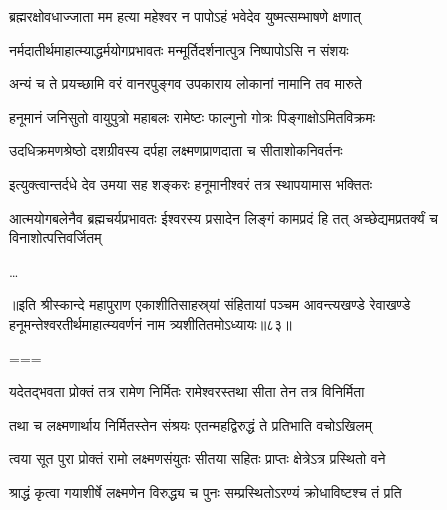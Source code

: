 
\twolineshloka
{ब्रह्मरक्षोवधाज्जाता मम हत्या महेश्वर}
{न पापोऽहं भवेदेव युष्मत्सम्भाषणे क्षणात्}%


\twolineshloka
{नर्मदातीर्थमाहात्म्याद्धर्मयोगप्रभावतः}
{मन्मूर्तिदर्शनात्पुत्र निष्पापोऽसि न संशयः}%

\twolineshloka
{अन्यं च ते प्रयच्छामि वरं वानरपुङ्गव}
{उपकाराय लोकानां नामानि तव मारुते}%

\twolineshloka
{हनूमानं जनिसुतो वायुपुत्रो महाबलः}
{रामेष्टः फाल्गुनो गोत्रः पिङ्गाक्षोऽमितविक्रमः}%

\twolineshloka
{उदधिक्रमणश्रेष्ठो दशग्रीवस्य दर्पहा}
{लक्ष्मणप्राणदाता च सीताशोकनिवर्तनः}%

\twolineshloka
{इत्युक्त्वान्तर्दधे देव उमया सह शङ्करः}
{हनूमानीश्वरं तत्र स्थापयामास भक्तितः}%

\threelineshloka
{आत्मयोगबलेनैव ब्रह्मचर्यप्रभावतः}
{ईश्वरस्य प्रसादेन लिङ्गं कामप्रदं हि तत्}
{अच्छेद्यमप्रतर्क्यं च विनाशोत्पत्तिवर्जितम्}%

\ldots

॥इति श्रीस्कान्दे महापुराण एकाशीतिसाहस्र्यां संहितायां पञ्चम आवन्त्यखण्डे रेवाखण्डे हनूमन्तेश्वरतीर्थमाहात्म्यवर्णनं नाम त्र्यशीतितमोऽध्यायः॥८३॥

===


\vakta{}
\shrota{}
\tags{}
\notes{}

\storymeta





\twolineshloka
{यदेतद्भवता प्रोक्तं तत्र रामेण निर्मितः}
{रामेश्वरस्तथा सीता तेन तत्र विनिर्मिता}%

\twolineshloka
{तथा च लक्ष्मणार्थाय निर्मितस्तेन संश्रयः}
{एतन्महद्विरुद्धं ते प्रतिभाति वचोऽखिलम्}%

\twolineshloka
{त्वया सूत पुरा प्रोक्तं रामो लक्ष्मणसंयुतः}
{सीतया सहितः प्राप्तः क्षेत्रेऽत्र प्रस्थितो वने}%

\twolineshloka
{श्राद्धं कृत्वा गयाशीर्षे लक्ष्मणेन विरुद्ध्य च}
{पुनः सम्प्रस्थितोऽरण्यं क्रोधाविष्टश्च तं प्रति}%

